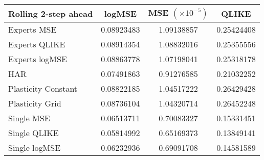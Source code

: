 
\begin{tabular}{l|c|c|c}
Rolling 2-step ahead     & logMSE & MSE $(\times 10^{-5})$ & QLIKE \\\hline
Experts MSE & 0.08923483 & 1.09138857 & 0.25424408\\ 
Experts QLIKE & 0.08914354 & 1.08832016 & 0.25355556\\ 
Experts logMSE & 0.08863778 & 1.07198041 & 0.25318178\\ 
HAR & 0.07491863 & 0.91276585 & 0.21032252\\ 
Plasticity Constant & 0.08822185 & 1.04517222 & 0.26429428\\ 
Plasticity Grid & 0.08736104 & 1.04320714 & 0.26452248\\ 
Single MSE & 0.06513711 & 0.70083327 & 0.15331451\\ 
Single QLIKE & 0.05814992 & 0.65169373 & 0.13849141\\ 
Single logMSE & 0.06232936 & 0.69091708 & 0.14581589\\ 
\end{tabular}
